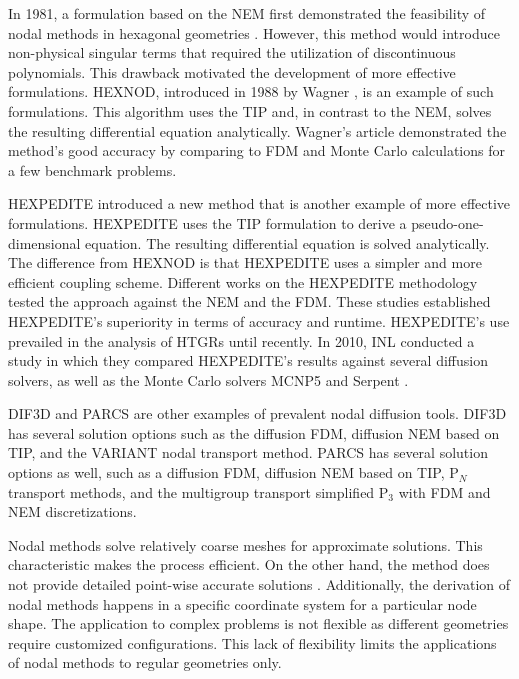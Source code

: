 In 1981, a formulation based on the \gls{NEM} first demonstrated the feasibility of nodal methods in hexagonal geometries \cite{duracz_nodal_1981}.
However, this method would introduce non-physical singular terms that required the utilization of discontinuous polynomials.
This drawback motivated the development of more effective formulations.
HEXNOD, introduced in 1988 by Wagner \cite{wagner_three-dimensional_1989}, is an example of such formulations.
This algorithm uses the \gls{TIP} and, in contrast to the \gls{NEM}, solves the resulting differential equation analytically.
Wagner's article demonstrated the method's good accuracy by comparing to \gls{FDM} and Monte Carlo calculations for a few benchmark problems.

HEXPEDITE \cite{fitzpatrick_hexpedite_1992} introduced a new method that is another example of more effective formulations.
HEXPEDITE uses the \gls{TIP} formulation to derive a pseudo-one-dimensional equation.
The resulting differential equation is solved analytically.
The difference from HEXNOD is that HEXPEDITE uses a simpler and more efficient coupling scheme.
Different works \cite{fitzpatrick_hexpedite_1992}\cite{fitzpatrick_developments_1995} on the HEXPEDITE methodology tested the approach against the \gls{NEM} and the \gls{FDM}.
These studies established HEXPEDITE’s superiority in terms of accuracy and runtime.
HEXPEDITE's use prevailed in the analysis of \glspl{HTGR} until recently.
In 2010, \gls{INL} conducted a study \cite{ortensi_deterministic_2010-1} in which they compared HEXPEDITE's results against several diffusion solvers, as well as the Monte Carlo solvers MCNP5 \cite{rsicc_computer_code_collection_mcnp5_2003} and Serpent \cite{leppanen_serpent_2015}.

DIF3D \cite{lawrence_dif3d_1983} and PARCS \cite{downar_parcs_2004} are other examples of prevalent nodal diffusion tools.
DIF3D has several solution options such as the diffusion \gls{FDM}, diffusion \gls{NEM} based on \gls{TIP}, and the VARIANT nodal transport method.
PARCS has several solution options as well, such as a diffusion \gls{FDM}, diffusion \gls{NEM} based on \gls{TIP}, P$_{N}$ transport methods, and the multigroup transport simplified P$_3$ with \gls{FDM} and \gls{NEM} discretizations.

Nodal methods solve relatively coarse meshes for approximate solutions.
This characteristic makes the process efficient.
On the other hand, the method does not provide detailed point-wise accurate solutions \cite{kang_finite_1973}.
Additionally, the derivation of nodal methods happens in a specific coordinate system for a particular node shape.
The application to complex problems is not flexible as different geometries require customized configurations.
This lack of flexibility limits the applications of nodal methods to regular geometries only.

